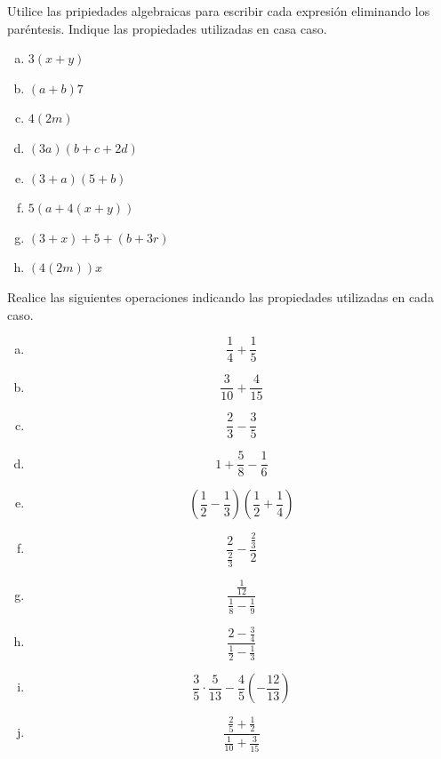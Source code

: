 \documentclass[11pt]{article}
\begin{document}
\begin{exercise}
Utilice las pripiedades algebraicas para escribir cada expresión eliminando los paréntesis. Indique las propiedades utilizadas en casa caso.
\begin{multicols}{3}
    \begin{enumerate}[a)]
        \item $3(x+y)$
        \item $(a+b)7$
        \item $4(2m)$
        \item $(3a)(b+c+2d)$
        \item $(3+a)(5+b)$
        \item $5(a+4(x+y))$
        \item $(3+x)+5+(b+3r)$
        \item $(4(2m))x$
    \end{enumerate}
\end{multicols}
\end{exercise}

\begin{exercise}
Realice las siguientes operaciones indicando las propiedades utilizadas en cada caso.
\begin{multicols}{3}
    \begin{enumerate}[a)]
        \item \[\frac{1}{4} + \frac{1}{5} \]
        \item \[ \frac{3}{10} + \frac{4}{15} \]
        \item \[ \frac{2}{3} - \frac{3}{5} \]
        \item \[ 1 + \frac{5}{8} - \frac{1}{6} \]
        \item \[ \left(\frac{1}{2} - \frac{1}{3}\right)\left(\frac{1}{2} + \frac{1}{4}\right) \]
        \item \[ \frac{2}{\frac{2}{3}} - \frac{\frac{2}{3}}{2} \]
        \item \[ \frac{\frac{1}{12}}{\frac{1}{8} - \frac{1}{9}} \]
        \item \[ \frac{2 - \frac{3}{4}}{\frac{1}{2} - \frac{1}{3}} \]
        \item \[ \frac{3}{5} \cdot \frac{5}{13} - \frac{4}{5} \left(-\frac{12}{13}\right) \]
        \item \[ \frac{\frac{2}{5} + \frac{1}{2}}{\frac{1}{10} + \frac{3}{15}} \]
    \end{enumerate}
\end{multicols}
\end{exercise}
\end{document}

